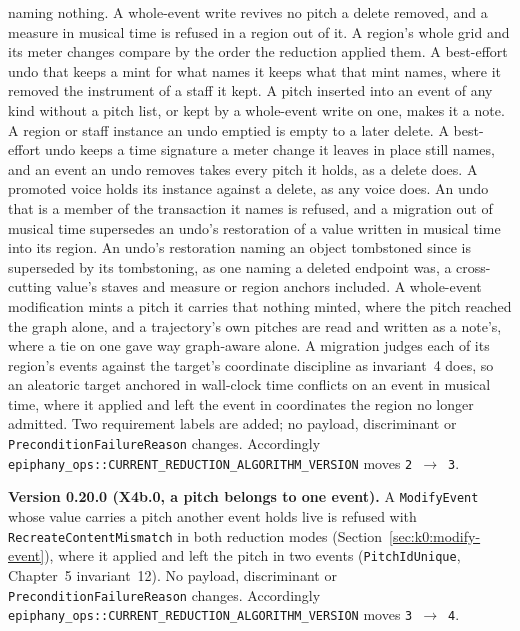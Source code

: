\documentclass[11pt,letterpaper]{report}
\newcounter{requirement}[chapter]
\begin{document}
naming nothing. A whole-event write revives no pitch a delete removed, and a
measure in musical time is refused in a region out of it. A region's whole grid
and its meter changes compare by the order the reduction applied them. A
best-effort undo that keeps a mint for what names it keeps what that mint
names, where it removed the instrument of a staff it kept. A pitch inserted
into an event of any kind without a pitch list, or kept by a whole-event
write on one, makes it a note. A region or staff instance an undo emptied
is empty to a later delete. A best-effort undo keeps a time signature a meter change it
leaves in place still names, and an event an undo removes takes every pitch
it holds, as a delete does. A promoted voice
holds its instance against a delete, as any voice does. An undo that is a
member of the transaction it names is refused, and a migration out of musical
time supersedes an undo's restoration of a value written in musical time into
its region. An undo's restoration naming an object tombstoned since is
superseded by its tombstoning, as one naming a deleted endpoint was, a
cross-cutting value's staves and measure or region anchors included. A
whole-event modification mints a pitch it carries that nothing minted, where
the pitch reached the graph alone, and a trajectory's own pitches are read and
written as a note's, where a tie on one gave way graph-aware alone. A
migration judges each of its region's events against the target's coordinate
discipline as invariant~4 does, so an aleatoric target anchored in wall-clock
time conflicts on an event in musical time, where it applied and left the
event in coordinates the region no longer admitted.
Two requirement labels are added;
no payload, discriminant or \texttt{PreconditionFailureReason} changes.
Accordingly
\texttt{epiphany\_ops::CURRENT\_REDUCTION\_ALGORITHM\_VERSION}
moves \texttt{2}~$\rightarrow$~\texttt{3}.

\noindent\textbf{Version 0.20.0 (X4b.0, a pitch belongs to one event).} A
\texttt{ModifyEvent} whose value carries a pitch another event holds live is
refused with \texttt{RecreateContentMismatch} in both reduction modes
(Section~\ref{sec:k0:modify-event}), where it applied and left the pitch in two
events (\texttt{PitchIdUnique}, Chapter~5 invariant~12). No
payload, discriminant or \texttt{PreconditionFailureReason} changes.
Accordingly \texttt{epiphany\_ops::CURRENT\_REDUCTION\_ALGORITHM\_VERSION}
moves \texttt{3}~$\rightarrow$~\texttt{4}.
\end{document}
